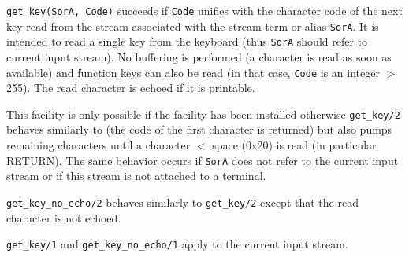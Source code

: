 \Description

\texttt{get\_key(SorA, Code)} succeeds if \texttt{Code} unifies with the
character code of the next key read from the stream associated with the
stream-term or alias \texttt{SorA}. It is intended to read a single key from
the keyboard (thus \texttt{SorA} should refer to current input stream). No
buffering is performed (a character is read as soon as available) and
function keys can also be read (in that case, \texttt{Code} is an integer $>$
255). The read character is echoed if it is printable.

This facility is only possible if the  facility has been
installed  otherwise \texttt{get\_key/2} behaves
similarly to   (the code of the first
character is returned) but also pumps remaining characters until a character
$<$ space (0x20) is read (in particular RETURN). The same behavior
occurs if \texttt{SorA} does not refer to the current input stream or if
this stream is not attached to a terminal.

\texttt{get\_key\_no\_echo/2} behaves similarly to \texttt{get\_key/2}
except that the read character is not echoed.

\texttt{get\_key/1} and \texttt{get\_key\_no\_echo/1} apply to the current
input stream.

\begin{PlErrors}








\end{PlErrors}

